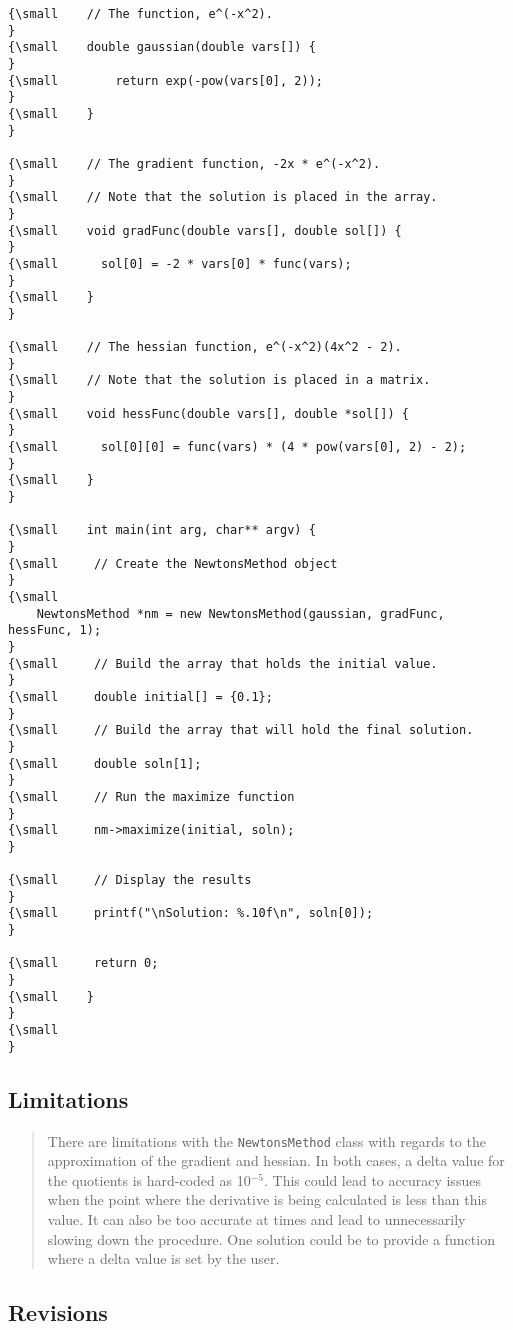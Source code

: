 \begin{verbatim}
{\small    // The function, e^(-x^2).
}
{\small    double gaussian(double vars[]) {
}
{\small        return exp(-pow(vars[0], 2));
}
{\small    }
}
 
{\small    // The gradient function, -2x * e^(-x^2).
}
{\small    // Note that the solution is placed in the array.
}
{\small    void gradFunc(double vars[], double sol[]) {
}
{\small      sol[0] = -2 * vars[0] * func(vars);
}
{\small    }
}
 
{\small    // The hessian function, e^(-x^2)(4x^2 - 2).
}
{\small    // Note that the solution is placed in a matrix.
}
{\small    void hessFunc(double vars[], double *sol[]) {
}
{\small      sol[0][0] = func(vars) * (4 * pow(vars[0], 2) - 2);
}
{\small    }
}
 
{\small    int main(int arg, char** argv) {
}
{\small     // Create the NewtonsMethod object
}
{\small 
    NewtonsMethod *nm = new NewtonsMethod(gaussian, gradFunc, hessFunc, 1);
}
{\small     // Build the array that holds the initial value.
}
{\small     double initial[] = {0.1};
}
{\small     // Build the array that will hold the final solution.
}
{\small     double soln[1];
}
{\small     // Run the maximize function
}
{\small     nm->maximize(initial, soln);
}
 
{\small     // Display the results
}
{\small     printf("\nSolution: %.10f\n", soln[0]);
}
 
{\small     return 0;
}
{\small    }
}
{\small   
}
\end{verbatim}

\subsection*{Limitations}

\begin{quotation}
There are limitations with the \texttt{NewtonsMethod} class with regards to
the approximation of the gradient and hessian. In both cases, a delta value
for the quotients is hard-coded as 10$^{-5}$. This could lead to accuracy
issues when the point where the derivative is being calculated is less than
this value. It can also be too accurate at times and lead to unnecessarily
slowing down the procedure. One solution could be to provide a function
where a delta value is set by the user.
\end{quotation}

\subsection*{Revisions}


